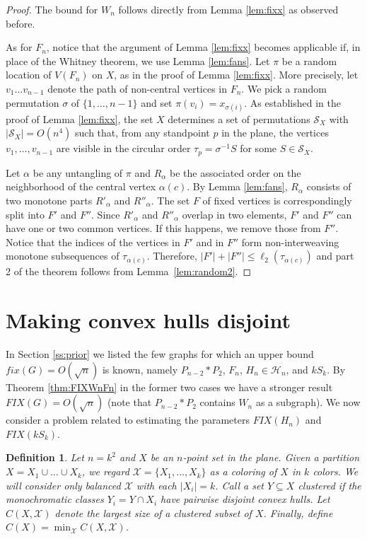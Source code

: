 \documentclass[reqno,12pt]{amsart}
\newtheorem{definition}[theorem]{Definition}
\newcommand{\fix}[1]{\mathit{fix}(#1)}
\newcommand{\FIX}[1]{\mathit{FIX}(#1)}
\newcommand{\calS}{{\mathcal S}}
\newcommand{\colX}{{\mathcal X}}
\newcommand{\calH}{{\mathcal H}}
\begin{document}
\begin{proof}
The bound for $W_n$ follows directly from Lemma \ref{lem:fixx} as observed before.

As for $F_n$, notice that the argument of Lemma \ref{lem:fixx} becomes applicable
if, in place of the Whitney theorem, we use Lemma \ref{lem:fans}.
Let $\pi$ be a random location of $V(F_n)$ on $X$, as in the proof
of Lemma \ref{lem:fixx}. 
More precisely, let $v_1\ldots v_{n-1}$ denote the path of non-central vertices
in $F_n$. We pick a random permutation $\sigma$ of $\{1,\ldots,n-1\}$ and set
$\pi(v_i)=x_{\sigma(i)}$. As established in the proof of Lemma \ref{lem:fixx},
the set $X$ determines a set of permutations $\calS_X$ with $|\calS_X|=O(n^4)$
such that, from any standpoint $p$ in the plane, the vertices 
$v_1,\ldots, v_{n-1}$ are visible in the circular order $\tau_p=\sigma^{-1}S$
for some $S\in\calS_X$.

Let $\alpha$ be any untangling of $\pi$ and $R_\alpha$
be the associated order on the neighborhood of the central vertex $\alpha(c)$.
By Lemma \ref{lem:fans}, $R_\alpha$ consists of two monotone parts
$R'_\alpha$ and $R''_\alpha$. The set $F$ of fixed vertices is correspondingly
split into $F'$ and $F''$.
Since $R'_\alpha$ and $R''_\alpha$ overlap in two elements,
$F'$ and $F''$ can have one or two common vertices. If this happens,
we remove those from $F''$.
Notice that the indices of the vertices in $F'$ and in $F''$ form
non-interweaving monotone subsequences of $\tau_{\alpha(c)}$. 
Therefore, $|F'|+|F''|\le\ell_2(\tau_{\alpha(c)})$
and part 2 of the theorem follows from Lemma~\ref{lem:random2}.
\end{proof}


\section{Making convex hulls disjoint}\label{s:hulls}

In Section \ref{ss:prior} we listed the few graphs for which an upper
bound $\fix G=O(\sqrt n)$ is known, namely $P_{n-2}*P_2$, $F_n$, $H_n\in\calH_n$, and $kS_k$.
By Theorem \ref{thm:FIXWnFn} in the former two cases we have a stronger
result $\FIX G=O(\sqrt n)$ (note that $P_{n-2}*P_2$ contains $W_n$ as a subgraph).
We now consider a problem related to estimating the parameters $\FIX{H_n}$
and $\FIX{kS_k}$. 

\begin{definition}\label{def:CX}\rm
Let $n=k^2$ and $X$ be an $n$-point set in the plane.
Given a partition $X=X_1\cup\ldots\cup X_k$, we regard $\colX=\{X_1,\ldots,X_k\}$ 
as a coloring of $X$ in $k$ colors.
We will consider only \emph{balanced} $\colX$ with each $|X_i|=k$.
Call a set $Y\subseteq X$ \emph{clustered} if the monochromatic classes
$Y_i=Y\cap X_i$ have pairwise disjoint convex hulls.
Let $C(X,\colX)$ denote the largest size of a clustered subset of $X$.
Finally, define $C(X)=\min_\colX C(X,\colX)$.
\end{definition}
\end{document}
